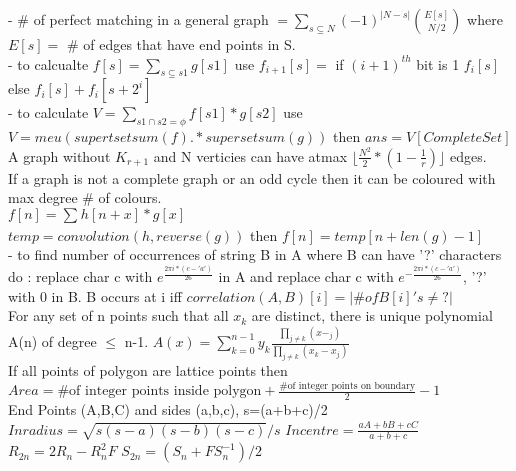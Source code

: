 - \# of perfect matching in a general graph $ = \sum_{s\subseteq N} (-1)^{|N-s|} \binom{E[s]}{N/2}$ where $E[s] =$ # of edges that have end points in S. \\
- to calcualte $f[s] = \sum_{s \subseteq s1} g[s1] $ use 
$ f_{i+1}[s] =$ if $(i+1)^{th}$ bit is 1 $f_{i}[s]$ else $f_{i}[s] + f_{i}[s+2^{i}] $ \\
- to calculate $V = \sum_{s1\cap s2 = \phi} f[s1]*g[s2]$ use $V=meu(supertsetsum(f) .* supersetsum(g))$ then $ans = V[Complete Set]$ \\ 
 A graph without $K_{r+1}$ and N verticies can have atmax $\lfloor \frac{N^{2}}{2} * (1 - \frac{1}{r}) \rfloor$ edges. \\
 If a graph is not a complete graph or an odd cycle then it can be coloured with max degree \# of colours. \\
 $f[n]=\sum_{}{} h[n+x]*g[x]$ \\
$temp=convolution(h,reverse(g))$ then $f[n]=temp[n+len(g)-1]$ \\
- to find number of occurrences of string B in A where B can have '?' characters do : replace char c with $e^{\frac{2\pi i * (c -'a')}{26}}$ in A and replace char c with $e^{-\frac{2\pi i * (c -'a')}{26}}$, '?' with 0 in B. B occurs at i iff $correlation(A,B)[i] = |\# of B[i]'s \neq ?| $ \\
 For any set of n points such that all $x_{k}$ are distinct, there is unique polynomial A(n) of degree $\le$ n-1. $A(x) = \sum_{k=0}^{n-1} y_{k} \frac{\prod_{j\neq k}(x-_{j})}{\prod_{j\neq k}(x_{k}-x_{j})}$\\
 If all points of polygon are lattice points then $Area = \text{\# of integer points inside polygon} + \frac{\text{\# of integer points on boundary}}{2} -1$ \\
 End Points (A,B,C) and sides (a,b,c), s=(a+b+c)/2\\
$Inradius = \sqrt{s(s-a)(s-b)(s-c)}/s$  $Incentre = \frac{aA+bB+cC}{a+b+c}$ \\
 $R_{2n} = 2R_{n} - R_{n}^{2}F$ 
   $S_{2n}=(S_{n}+FS_{n}^{-1})/2$

